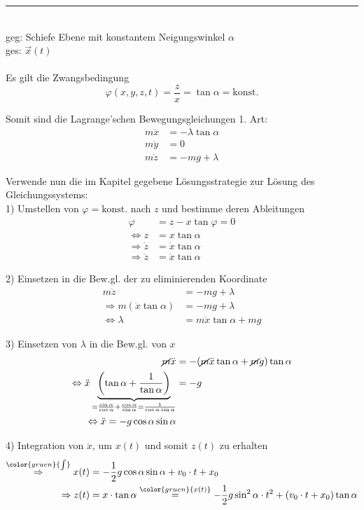 \documentclass{article}
\newcommand{\lr}[1]{\left(#1\right)}
\newcommand{\comment}[1]{{\color{gruen} {#1}}}
\begin{document}
{\color{blue}
\hrule
	\\
	geg: Schiefe Ebene mit konstantem Neigungswinkel $\alpha$\\
	ges: $\vec{x}(t)$\\
	\\
	Es gilt die Zwangsbedingung
		$$\varphi(x,y,z,t) = \frac{z}{x} = \tan\alpha = \text{konst.}$$
	
	Somit sind die Lagrange'schen Bewegungsgleichungen 1. Art:
		\begin{align*}
			m\ddot{x} &= -\lambda\tan\alpha \\
			m\ddot{y} &= 0 \\
			m\ddot{z} &= -mg + \lambda
		\end{align*}
	
	Verwende nun die im Kapitel gegebene Lösungsstrategie zur Lösung des Gleichungssystems:\\
	1) Umstellen von $\varphi = \text{konst.}$ nach $z$ und bestimme deren Ableitungen
		\begin{align*}
			\varphi &= z - x\tan\varphi = 0 \\
			\Leftrightarrow z &= x\tan\alpha \\
			\Rightarrow \dot{z} &= \dot{x}\tan\alpha \\
			\Rightarrow \ddot{z} &= \ddot{x}\tan\alpha
		\end{align*}
	
	2) Einsetzen in die Bew.gl. der zu eliminierenden Koordinate
		\begin{align*}
			m\ddot{z} &= -mg + \lambda \\
			\Rightarrow m (\ddot{x}\tan\alpha) &= -mg + \lambda \\
			\Leftrightarrow \lambda &= m\ddot{x}\tan\alpha + mg
		\end{align*}
	
	3) Einsetzen von $\lambda$ in die Bew.gl. von $x$
		\begin{align*}
			\cancel{m}\ddot{x} &= -(\cancel{m}\ddot{x}\tan\alpha + \cancel{m}g) \tan\alpha \\
			\Leftrightarrow \ddot{x} \underbrace{\lr{ \tan\alpha + \frac{1}{\tan\alpha}} }_{= \frac{\sin\alpha}{\cos\alpha} + \frac{\cos\alpha}{\sin\alpha} = \frac{1}{\cos\alpha\sin\alpha}} &= -g \\
			\Leftrightarrow \ddot{x} = -g\cos\alpha\sin\alpha
		\end{align*}
		
	4) Integration von $\ddot{x}$, um $x(t)$ und somit $z(t)$ zu erhalten
		\begin{align*}
			\stackrel{\comment{\int}}{\Rightarrow} x(t) &= -\frac{1}{2} g \cos\alpha\sin\alpha + v_0\cdot t + x_0 \\
			\Rightarrow z(t) &= x\cdot \tan\alpha \stackrel{\comment{x(t)}}{=} - \frac{1}{2} g \sin^2\alpha\cdot t^2 + (v_0\cdot t + x_0) \tan\alpha
		\end{align*}


}
\end{document}
